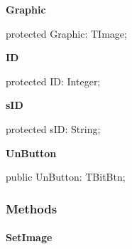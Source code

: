 \documentclass{report}
\newif\ifpdf
\begin{document}
\begin{list}{}
\par  \label{lentries.TListEntry-Graphic}
\item[\textbf{Graphic}\hfill]
\ifpdf
\begin{flushleft}
\fi
\begin{ttfamily}
protected Graphic: TImage;\end{ttfamily}

\ifpdf
\end{flushleft}
\fi


\par  \label{lentries.TListEntry-ID}
\item[\textbf{ID}\hfill]
\ifpdf
\begin{flushleft}
\fi
\begin{ttfamily}
protected ID: Integer;\end{ttfamily}

\ifpdf
\end{flushleft}
\fi


\par  \label{lentries.TListEntry-sID}
\item[\textbf{sID}\hfill]
\ifpdf
\begin{flushleft}
\fi
\begin{ttfamily}
protected sID: String;\end{ttfamily}

\ifpdf
\end{flushleft}
\fi


\par  \label{lentries.TListEntry-UnButton}
\item[\textbf{UnButton}\hfill]
\ifpdf
\begin{flushleft}
\fi
\begin{ttfamily}
public UnButton: TBitBtn;\end{ttfamily}

\ifpdf
\end{flushleft}
\fi


\par  \end{list}
\subsubsection*{\large{\textbf{Methods}}\normalsize\hspace{1ex}\hfill}
\paragraph*{SetImage}\hspace*{\fill}
\end{document}

